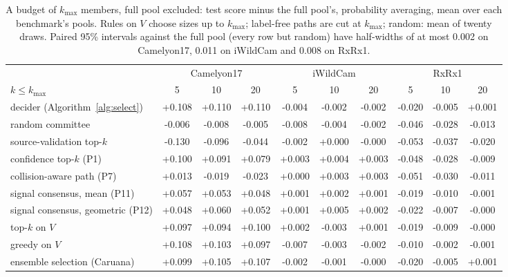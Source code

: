 \begin{table}[t]
\centering
\footnotesize
\caption{A budget of $k_{\max}$ members, full pool excluded: test score minus the full pool's, probability averaging, mean over each benchmark's pools. Rules on $V$ choose sizes up to $k_{\max}$; label-free paths are cut at $k_{\max}$; random: mean of twenty draws. Paired 95\% intervals against the full pool (every row but random) have half-widths of at most 0.002 on Camelyon17, 0.011 on iWildCam and 0.008 on RxRx1.}
\label{tab:budget}
\setlength{\tabcolsep}{3pt}\begin{adjustbox}{max width=\linewidth}
\begin{tabular}{lccccccccc}
\toprule
 & \multicolumn{3}{c}{Camelyon17} & \multicolumn{3}{c}{iWildCam} & \multicolumn{3}{c}{RxRx1} \\ \cmidrule(lr){2-4}\cmidrule(lr){5-7}\cmidrule(lr){8-10} $k\le k_{\max}$ & 5 & 10 & 20 & 5 & 10 & 20 & 5 & 10 & 20 \\
\midrule
decider (Algorithm~\ref{alg:select}) & +0.108 & +0.110 & +0.110 & -0.004 & -0.002 & -0.002 & -0.020 & -0.005 & +0.001 \\
random committee & -0.006 & -0.008 & -0.005 & -0.008 & -0.004 & -0.002 & -0.046 & -0.028 & -0.013 \\
\addlinespace
source-validation top-$k$ & -0.130 & -0.096 & -0.044 & -0.002 & +0.000 & -0.000 & -0.053 & -0.037 & -0.020 \\
confidence top-$k$ (P1) & +0.100 & +0.091 & +0.079 & +0.003 & +0.004 & +0.003 & -0.048 & -0.028 & -0.009 \\
collision-aware path (P7) & +0.013 & -0.019 & -0.023 & +0.000 & +0.003 & +0.003 & -0.051 & -0.030 & -0.011 \\
signal consensus, mean (P11) & +0.057 & +0.053 & +0.048 & +0.001 & +0.002 & +0.001 & -0.019 & -0.010 & -0.001 \\
signal consensus, geometric (P12) & +0.048 & +0.060 & +0.052 & +0.001 & +0.005 & +0.002 & -0.022 & -0.007 & -0.000 \\
\addlinespace
top-$k$ on $V$ & +0.097 & +0.094 & +0.100 & +0.002 & -0.003 & +0.001 & -0.019 & -0.009 & -0.000 \\
greedy on $V$ & +0.108 & +0.103 & +0.097 & -0.007 & -0.003 & -0.002 & -0.010 & -0.002 & -0.001 \\
ensemble selection (Caruana) & +0.099 & +0.105 & +0.107 & -0.002 & -0.001 & -0.000 & -0.020 & -0.005 & +0.001 \\
\bottomrule
\end{tabular}
\end{adjustbox}
\end{table}
